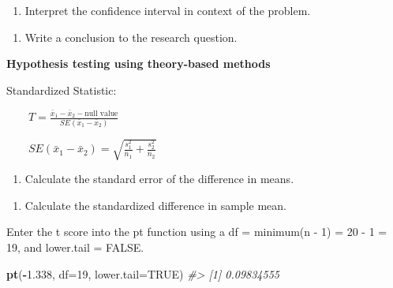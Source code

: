 \documentclass[
]{report}
\newenvironment{Shaded}{\begin{snugshade}}{\end{snugshade}}
\newcommand{\AttributeTok}[1]{\textcolor[rgb]{0.13,0.29,0.53}{#1}}
\newcommand{\CommentTok}[1]{\textcolor[rgb]{0.56,0.35,0.01}{\textit{#1}}}
\newcommand{\ConstantTok}[1]{\textcolor[rgb]{0.56,0.35,0.01}{#1}}
\newcommand{\DecValTok}[1]{\textcolor[rgb]{0.00,0.00,0.81}{#1}}
\newcommand{\FloatTok}[1]{\textcolor[rgb]{0.00,0.00,0.81}{#1}}
\newcommand{\FunctionTok}[1]{\textcolor[rgb]{0.13,0.29,0.53}{\textbf{#1}}}
\newcommand{\NormalTok}[1]{#1}
\newcommand{\SpecialCharTok}[1]{\textcolor[rgb]{0.81,0.36,0.00}{\textbf{#1}}}
\providecommand{\tightlist}{%
  \setlength{\itemsep}{0pt}\setlength{\parskip}{0pt}}
\begin{document}
\begin{enumerate}
\def\labelenumi{\arabic{enumi}.}
\setcounter{enumi}{5}
\tightlist
\item
  Interpret the confidence interval in context of the problem.
\end{enumerate}

\vspace{0.5in}

\begin{enumerate}
\def\labelenumi{\arabic{enumi}.}
\setcounter{enumi}{6}
\tightlist
\item
  Write a conclusion to the research question.
\end{enumerate}

\vspace{0.5in}

\newpage

\textbf{Hypothesis testing using theory-based methods}

Standardized Statistic:

~~~~\(T = \frac{\bar{x}_1 - \bar{x}_2-\mbox{null value}}{SE(\bar{x}_1 - \bar{x}_2)}\)

~~~~\(SE(\bar{x}_1 - \bar{x}_2)=\sqrt{\frac{s_1^2}{n_1}+\frac{s_2^2}{n_2}}\)

\begin{enumerate}
\def\labelenumi{\arabic{enumi}.}
\setcounter{enumi}{7}
\tightlist
\item
  Calculate the standard error of the difference in means.
\end{enumerate}

\vspace{0.5in}

\begin{enumerate}
\def\labelenumi{\arabic{enumi}.}
\setcounter{enumi}{8}
\tightlist
\item
  Calculate the standardized difference in sample mean.
\end{enumerate}

\vspace{0.5in}

Enter the t score into the pt function using a df = minimum(n - 1) = 20 - 1 = 19, and lower.tail = FALSE.

\begin{Shaded}
\begin{Highlighting}[]
\FunctionTok{pt}\NormalTok{(}\SpecialCharTok{{-}}\FloatTok{1.338}\NormalTok{, }\AttributeTok{df=}\DecValTok{19}\NormalTok{, }\AttributeTok{lower.tail=}\ConstantTok{TRUE}\NormalTok{)}
\CommentTok{\#\textgreater{} [1] 0.09834555}
\end{Highlighting}
\end{Shaded}
\end{document}
